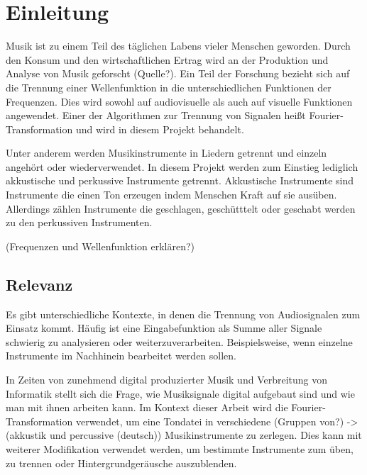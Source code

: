 \chapter{Einleitung}
%

Musik ist zu einem Teil des täglichen Labens vieler Menschen geworden. Durch den Konsum und den wirtschaftlichen Ertrag wird an der Produktion und Analyse von Musik geforscht (Quelle?). Ein Teil der Forschung bezieht sich auf die Trennung einer Wellenfunktion in die unterschiedlichen Funktionen der Frequenzen. Dies wird sowohl auf audiovisuelle als auch auf visuelle Funktionen angewendet. Einer der Algorithmen zur Trennung von Signalen heißt Fourier-Transformation und wird in diesem Projekt behandelt.

\par

Unter anderem werden Musikinstrumente in Liedern getrennt und einzeln angehört oder wiederverwendet. In diesem Projekt werden zum Einstieg lediglich akkustische und perkussive Instrumente getrennt. Akkustische Instrumente sind Instrumente die einen Ton erzeugen indem Menschen Kraft auf sie ausüben. Allerdings zählen Instrumente die geschlagen, geschütttelt oder geschabt werden zu den perkussiven Instrumenten.

%
(Frequenzen und Wellenfunktion erklären?)
%

%
\section{Relevanz}
%

Es gibt unterschiedliche Kontexte, in denen die Trennung von Audiosignalen zum Einsatz kommt. Häufig ist eine Eingabefunktion als Summe aller Signale schwierig zu analysieren oder weiterzuverarbeiten. Beispielsweise, wenn einzelne Instrumente im Nachhinein bearbeitet werden sollen.

\par

In Zeiten von zunehmend digital produzierter Musik und Verbreitung von Informatik stellt sich die Frage, wie Musiksignale digital aufgebaut sind und wie man mit ihnen arbeiten kann. Im Kontext dieser Arbeit wird die Fourier-Transformation verwendet, um eine Tondatei in verschiedene (Gruppen von?) -> (akkustik und percussive (deutsch)) Musikinstrumente zu zerlegen. Dies kann mit weiterer Modifikation verwendet werden, um bestimmte Instrumente zum üben, zu trennen oder Hintergrundgeräusche auszublenden.

\par

